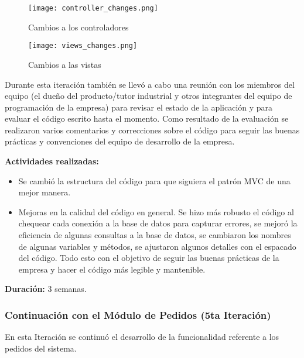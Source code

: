 \begin{figure}[H]
    \centering
    \texttt{[image: controller\_changes.png]}
    \caption{Cambios a los controladores}
    \label{fig:controller_changes}
\end{figure}

\begin{figure}[H]
    \centering
    \texttt{[image: views\_changes.png]}
    \caption{Cambios a las vistas}
    \label{fig:views_changes}
\end{figure}

Durante esta iteración también se llevó a cabo una reunión con los miembros del equipo (el dueño del producto/tutor industrial y otros integrantes del equipo de programación de la empresa) para revisar el estado de la aplicación y para evaluar el código escrito hasta el momento. Como resultado de la evaluación se realizaron varios comentarios y correcciones sobre el código para seguir las buenas prácticas y convenciones del equipo de desarrollo de la empresa.

\vspace{0.3cm}
\textbf{Actividades realizadas:}
\begin{itemize}
    \item Se cambió la estructura del código para que siguiera el patrón MVC de una mejor manera.
    \item Mejoras en la calidad del código en general. Se hizo más robusto el código al chequear cada conexión a la base de datos para capturar errores, se mejoró la eficiencia de algunas consultas a la base de datos, se cambiaron los nombres de algunas variables y métodos, se ajustaron algunos detalles con el espacado del código. Todo esto con el objetivo de seguir las buenas prácticas de la empresa y hacer el código más legible y mantenible.
\end{itemize}

\textbf{Duración:} 3 semanas.

\subsubsection{Continuación con el Módulo de Pedidos (5ta Iteración)}
En esta Iteración se continuó el desarrollo de la funcionalidad referente a los pedidos del sistema.

